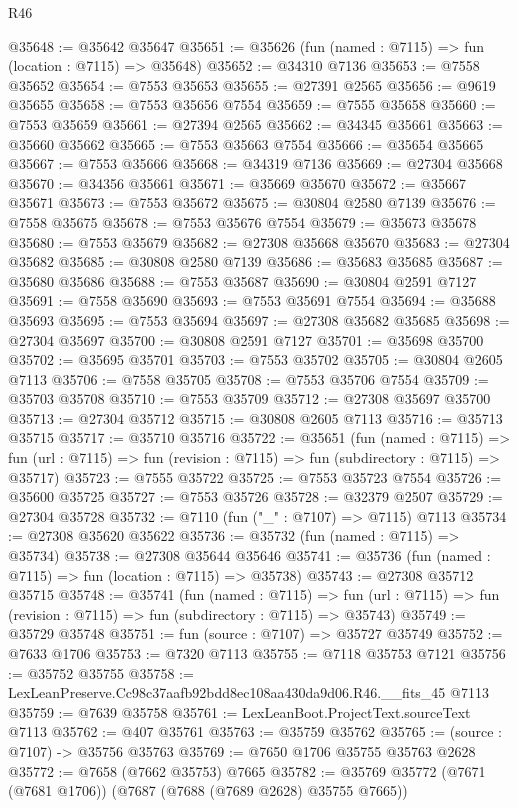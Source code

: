 \begin{lexlean}{R46}
\begin{coremodule}
@35648 := @35642 @35647
@35651 := @35626 (fun (named : @7115) => fun (location : @7115) => @35648)
@35652 := @34310 @7136
@35653 := @7558 @35652
@35654 := @7553 @35653
@35655 := @27391 @2565
@35656 := @9619 @35655
@35658 := @7553 @35656 @7554
@35659 := @7555 @35658
@35660 := @7553 @35659
@35661 := @27394 @2565
@35662 := @34345 @35661
@35663 := @35660 @35662
@35665 := @7553 @35663 @7554
@35666 := @35654 @35665
@35667 := @7553 @35666
@35668 := @34319 @7136
@35669 := @27304 @35668
@35670 := @34356 @35661
@35671 := @35669 @35670
@35672 := @35667 @35671
@35673 := @7553 @35672
@35675 := @30804 @2580 @7139
@35676 := @7558 @35675
@35678 := @7553 @35676 @7554
@35679 := @35673 @35678
@35680 := @7553 @35679
@35682 := @27308 @35668 @35670
@35683 := @27304 @35682
@35685 := @30808 @2580 @7139
@35686 := @35683 @35685
@35687 := @35680 @35686
@35688 := @7553 @35687
@35690 := @30804 @2591 @7127
@35691 := @7558 @35690
@35693 := @7553 @35691 @7554
@35694 := @35688 @35693
@35695 := @7553 @35694
@35697 := @27308 @35682 @35685
@35698 := @27304 @35697
@35700 := @30808 @2591 @7127
@35701 := @35698 @35700
@35702 := @35695 @35701
@35703 := @7553 @35702
@35705 := @30804 @2605 @7113
@35706 := @7558 @35705
@35708 := @7553 @35706 @7554
@35709 := @35703 @35708
@35710 := @7553 @35709
@35712 := @27308 @35697 @35700
@35713 := @27304 @35712
@35715 := @30808 @2605 @7113
@35716 := @35713 @35715
@35717 := @35710 @35716
@35722 := @35651
    (fun (named : @7115) =>
    fun (url : @7115) => fun (revision : @7115) => fun (subdirectory : @7115) => @35717)
@35723 := @7555 @35722
@35725 := @7553 @35723 @7554
@35726 := @35600 @35725
@35727 := @7553 @35726
@35728 := @32379 @2507
@35729 := @27304 @35728
@35732 := @7110 (fun ("_" : @7107) => @7115) @7113
@35734 := @27308 @35620 @35622
@35736 := @35732 (fun (named : @7115) => @35734)
@35738 := @27308 @35644 @35646
@35741 := @35736 (fun (named : @7115) => fun (location : @7115) => @35738)
@35743 := @27308 @35712 @35715
@35748 := @35741
    (fun (named : @7115) =>
    fun (url : @7115) => fun (revision : @7115) => fun (subdirectory : @7115) => @35743)
@35749 := @35729 @35748
@35751 := fun (source : @7107) => @35727 @35749
@35752 := @7633 @1706
@35753 := @7320 @7113
@35755 := @7118 @35753 @7121
@35756 := @35752 @35755
@35758 := LexLeanPreserve.Cc98c37aafb92bdd8ec108aa430da9d06.R46.__fits_45 @7113
@35759 := @7639 @35758
@35761 := LexLeanBoot.ProjectText.sourceText @7113
@35762 := @407 @35761
@35763 := @35759 @35762
@35765 := (source : @7107) -> @35756 @35763
@35769 := @7650 @1706 @35755 @35763 @2628
@35772 := @7658 (@7662 @35753) @7665
@35782 := @35769 @35772 (@7671 (@7681 @1706)) (@7687 (@7688 (@7689 @2628) @35755 @7665))

\end{coremodule}
\end{lexlean}

